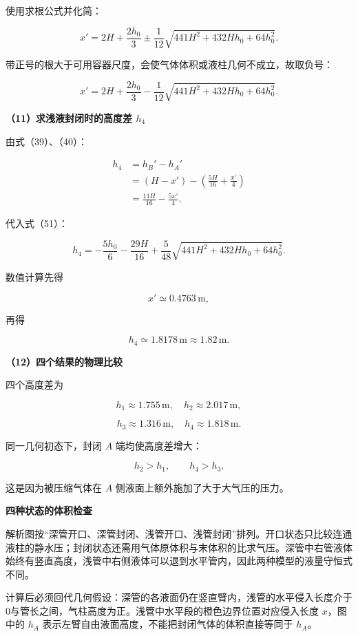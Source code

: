 \documentclass[12pt,a4paper,UTF8]{ctexart}
\begin{document}
使用求根公式并化简：

\[
x'
=2H+\frac{2h_0}{3}
\pm\frac1{12}
\sqrt{441H^2+432Hh_0+64h_0^2}.
\tag{50}
\]

带正号的根大于可用容器尺度，会使气体体积或液柱几何不成立，故取负号：

\[
\boxed{
x'
=2H+\frac{2h_0}{3}
-\frac1{12}
\sqrt{441H^2+432Hh_0+64h_0^2}
}.
\tag{51}
\]

\textbf{（11）求浅液封闭时的高度差 \(h_4\)}

由式（39）、（40）：

\[
\begin{aligned}
h_4
&=h_B'-h_A'\\
&=(H-x')-\left(\frac{5H}{16}+\frac{x'}4\right)\\
&=\frac{11H}{16}-\frac{5x'}4.
\end{aligned}
\tag{52}
\]

代入式（51）：

\[
\boxed{
h_4
=-\frac{5h_0}{6}-\frac{29H}{16}
+\frac5{48}
\sqrt{441H^2+432Hh_0+64h_0^2}
}.
\tag{53}
\]

数值计算先得

\[
x'\simeq0.4763\,\mathrm m,
\]

再得

\[
\boxed{h_4\simeq1.8178\,\mathrm m\approx1.82\,\mathrm m}.
\tag{54}
\]

\textbf{（12）四个结果的物理比较}

四个高度差为

\[
h_1\approx1.755\,\mathrm m,
\quad
h_2\approx2.017\,\mathrm m,
\]

\[
h_3\approx1.316\,\mathrm m,
\quad
h_4\approx1.818\,\mathrm m.
\]

同一几何初态下，封闭 \(A\) 端均使高度差增大：

\[
h_2>h_1,
\qquad
h_4>h_3.
\]

这是因为被压缩气体在 \(A\) 侧液面上额外施加了大于大气压的压力。

\textbf{四种状态的体积检查}

解析图按``深管开口、深管封闭、浅管开口、浅管封闭''排列。开口状态只比较连通液柱的静水压；封闭状态还需用气体原体积与末体积的比求气压。深管中右管液体始终有竖直高度，浅管中右侧液体可以退到水平管内，因此两种模型的液量守恒式不同。

计算后必须回代几何假设：深管的各液面仍在竖直臂内，浅管的水平侵入长度介于0与管长之间，气柱高度为正。浅管中水平段的橙色边界位置对应侵入长度
\(x\)，图中的 \(h_A\)
表示左臂自由液面高度，不能把封闭气体的体积直接等同于 \(h_A\)。
\end{document}
